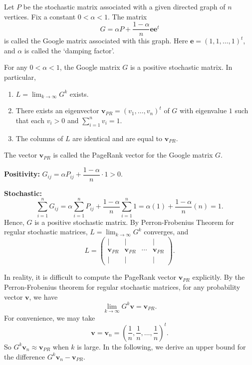 \begin{definition}
Let $P$ be the stochastic matrix associated with a given directed graph of $n$ vertices. Fix a constant $0<\alpha<1$. The matrix
\[
G
=
\alpha P
+
\frac{1-\alpha}{n}\mathbf{e}\mathbf{e}^t
\]
is called the Google matrix associated with this graph. Here $\mathbf{e}=(1,1,\dots,1)^t$, and $\alpha$ is called the `damping factor'.
\end{definition}


\begin{theorem}
For any $0<\alpha<1$, the Google matrix $G$ is a positive stochastic matrix. In particular,
\begin{enumerate}
    \item $L=\displaystyle\lim_{k\to\infty} G^k$ exists.
    \item There exists an eigenvector $\mathbf{v}_{PR}=(v_1,\dots,v_n)^t$ of $G$ with eigenvalue $1$ such that each $v_i>0$ and $\displaystyle\sum_{i=1}^n v_i=1$.
    \item The columns of $L$ are identical and are equal to $\mathbf{v}_{PR}$.
\end{enumerate}
The vector $\mathbf{v}_{PR}$ is called the PageRank vector for the Google matrix $G$.
\end{theorem}

\begin{pfbox}
\textbf{Positivity:} $G_{ij}=\alpha P_{ij}+\dfrac{1-\alpha}{n}\cdot 1>0$.

\textbf{Stochastic:}
\[
\sum_{i=1}^n G_{ij}
=
\alpha\sum_{i=1}^n P_{ij}
+
\frac{1-\alpha}{n}\sum_{i=1}^n 1
=
\alpha(1)+\frac{1-\alpha}{n}(n)
=
1.
\]
Hence, $G$ is a positive stochastic matrix. By Perron-Frobenius Theorem for regular stochastic matrices, $L=\displaystyle\lim_{k\to\infty} G^k$ converges, and
\[
L
=
\begin{pmatrix}
| & | & & |\\
\mathbf{v}_{PR} & \mathbf{v}_{PR} & \cdots & \mathbf{v}_{PR}\\
| & | & & |
\end{pmatrix}.
\]
\end{pfbox}

In reality, it is difficult to compute the PageRank vector $\mathbf{v}_{PR}$ explicitly. By the Perron-Frobenius theorem for regular stochastic matrices, for any probability vector $\mathbf{v}$, we have
\[
\lim_{k\to\infty}G^k\mathbf{v}
=
\mathbf{v}_{PR}.
\]
For convenience, we may take
\[
\mathbf{v}
=
\mathbf{v}_n
=
\left(\frac{1}{n},\frac{1}{n},\dots,\frac{1}{n}\right)^t.
\]
So $G^k\mathbf{v}_n\approx \mathbf{v}_{PR}$ when $k$ is large. In the following, we derive an upper bound for the difference $G^k\mathbf{v}_n-\mathbf{v}_{PR}$.

